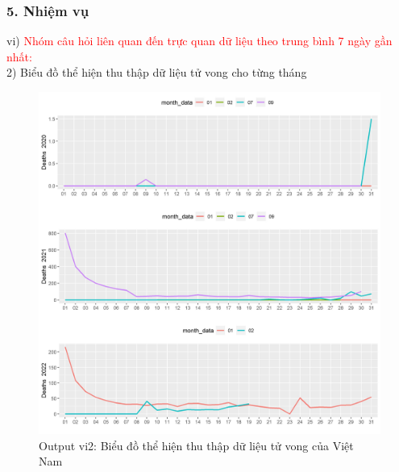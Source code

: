 \documentclass[english,10pt,table]{beamer}
\begin{document}
\begin{frame}[fragile]
\frametitle{5.  Nhiệm vụ}
vi) \textcolor{red}{Nhóm câu hỏi liên quan đến trực quan dữ liệu theo trung bình 7 ngày gần nhất:}\\
    2) Biểu đồ thể hiện thu thập dữ liệu tử vong cho từng tháng
	\begin{figure}[h!]
	\begin{center}
		    \includegraphics[scale = 0.26]{Images/VI/vi2 Vietnam .jpeg}
		     \caption{Output vi2: Biểu đồ thể hiện thu thập dữ liệu tử vong của Việt Nam}
		\end{center}
		\end{figure}
\end{frame}
\end{document}
